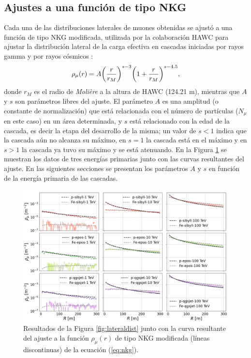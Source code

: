 \documentclass[12pt,letterpaper]{report}
\begin{document}
	\subsection{Ajustes a una funci\'on de tipo NKG}
	Cada una de las distribuciones laterales de muones obtenidas se ajust\'o a una funci\'on de tipo NKG modificada, utilizada por la colaboraci\'on HAWC para ajustar la distribuci\'on lateral de la carga efectiva en cascadas iniciadas por rayos gamma	\cite{Malone2018} y por rayos c\'osmicos \cite{Morales-Soto2019}:
	\begin{align} \label{eq:nkg}
	\rho_{\mu}(r) = A \qty(\frac{r}{r_M})^{s-3}\qty(1+\frac{r}{r_M})^{s-4.5},
	\end{align}
	donde $r_M$ es el radio de \textit{Moli\`ere} a la altura de HAWC (124.21 m), mientras que $A$ y $s$ son par\'ametros libres del ajuste. El par\'ametro $A$ es una amplitud (o constante de normalizaci\'on) que est\'a relacionada con el n\'umero de part\'iculas ($N_{\mu}$ en este caso) en un \'area determinada, y $s$ est\'a relacionado con la edad de la cascada, es decir la etapa del desarrollo de la misma; un valor de $s<1$ indica que la cascada a\'un no alcanza su m\'aximo, en $s=1$ la cascada est\'a en el m\'aximo y en $s>1$ la cascada ya tuvo su m\'aximo y se est\'a atenuando. En la Figura \ref{fig:lateraldist_wfits} se muestran los datos de tres energ\'ias primarias junto con las curvas resultantes del ajuste. En las siguientes secciones se presentan los par\'ametros $A$ y $s$ en funci\'on de la energ\'ia primaria de las cascadas.
		\begin{figure}[h] 
		\includegraphics[width=\textwidth]{Figuras/lateraldist_wfits}
		\caption{Resultados de la Figura \ref{fig:lateraldist} junto con la curva resultante del ajuste a la funci\'on $\rho_{\mu}(r)$ de tipo NKG modificada (l\'ineas discontinuas) de la ecuaci\'on (\ref{eq:nkg}).}
		\label{fig:lateraldist_wfits}
		\end{figure}
		
\end{document}
